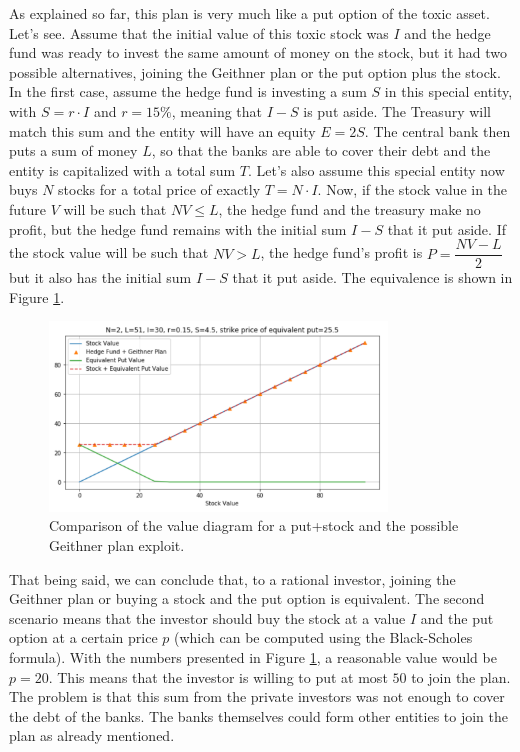 As explained so far, this plan is very much like a put option of the toxic asset. Let's see. Assume that the initial value of this toxic stock was $I$ and the hedge fund was ready to invest the same amount of money on the stock, but it had two possible alternatives, joining the Geithner plan or the put option plus the stock. In the first case, assume the hedge fund is investing a sum $S$ in this special entity, with $S = r \cdot I$ and $r = 15\%$, meaning that $I-S$ is put aside. The Treasury will match this sum and the entity will have an equity $E = 2S$. The central bank then puts a sum of money $L$, so that the banks are able to cover their debt and the entity is capitalized with a total sum $T$. Let's also assume this special entity now buys $N$ stocks for a total price of exactly $T = N \cdot I$. Now, if the stock value in the future $V$ will be such that $NV \leq L$, the hedge fund and the treasury make no profit, but the hedge fund remains with the initial sum $I-S$ that it put aside. If the stock value will be such that $NV > L$, the hedge fund's profit is $P = \dfrac{NV - L}{2}$ but it also has the initial sum $I-S$ that it put aside. The equivalence is shown in Figure \ref{fig:GPlan_HF}.
\begin{figure}[h!]
\centering
\includegraphics[width=0.8\textwidth]{images/GPlan_HF.png}
\caption{Comparison of the value diagram for a put+stock and the possible Geithner plan exploit.}
\label{fig:GPlan_HF}
\end{figure}
That being said, we can conclude that, to a rational investor, joining the Geithner plan or buying a stock and the put option is equivalent. The second scenario means that the investor should buy the stock at a value $I$ and the put option at a certain price $p$ (which can be computed using the Black-Scholes formula). With the numbers presented in Figure \ref{fig:GPlan_HF}, a reasonable value would be $p = 20$. This means that the investor is willing to put at most $50$ to join the plan. The problem is that this sum from the private investors was not enough to cover the debt of the banks. The banks themselves could form other entities to join the plan as already mentioned.

